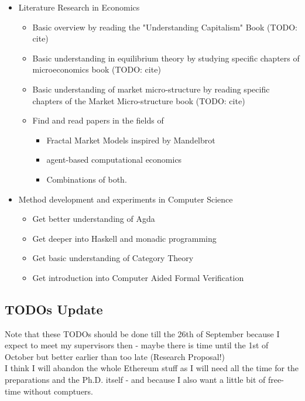 \begin{itemize}
\item Literature Research in Economics
	\begin{itemize}
	\item Basic overview by reading the "Understanding Capitalism" Book (TODO: cite)
	\item Basic understanding in equilibrium theory by studying specific chapters of microeconomics book (TODO: cite)
	\item Basic understanding of market micro-structure by reading specific chapters of the Market Micro-structure book (TODO: cite)
	\item Find and read papers in the fields of 
		\begin{itemize}
		\item Fractal Market Models inspired by Mandelbrot
		\item agent-based computational economics
		\item Combinations of both.
		\end{itemize}		
	\end{itemize}
\item Method development and experiments in Computer Science
	\begin{itemize}
	\item Get better understanding of Agda
	\item Get deeper into Haskell and monadic programming
	\item Get basic understanding of Category Theory
	\item Get introduction into Computer Aided Formal Verification
	\end{itemize}
\end{itemize}

\subsection*{TODOs Update}
Note that these TODOs should be done till the 26th of September because I expect to meet my supervisors then - maybe there is time until the 1st of October but better earlier than too late (Research Proposal!) \\ 
I think I will abandon the whole Ethereum stuff as I will need all the time for the preparations and the Ph.D. itself - and because I also want a little bit of free-time without comptuers.

